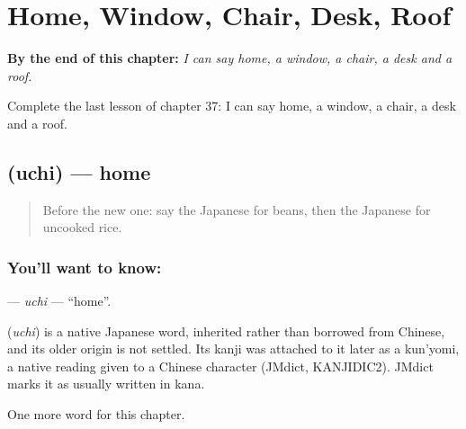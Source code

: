 
\chapter{Home, Window, Chair, Desk, Roof}
\label{ch:ja-home-window-chair-desk-roof}

\begin{chapteropening}
\textbf{By the end of this chapter:} \emph{I can say home, a window, a chair, a desk and a roof.}

Complete the last lesson of chapter 37: I can say home, a window, a chair, a desk and a roof.
\end{chapteropening}

\section[\texorpdfstring{\ja{うち} (uchi)}{うち (uchi)}]{ (uchi) — home}

\label{lesson:JA-C37-uchi}



\begin{quote}
Before the new one: say the Japanese for beans, then the Japanese for uncooked rice.
\end{quote}

\subsection*{You'll want to know: }
\textbf{} — \emph{uchi} — \textquotedblleft{}home\textquotedblright{}.

\begin{cousinweb}
\textbf{} (\emph{uchi}) is a native Japanese word, inherited rather than borrowed from Chinese, and its older origin is not settled. Its kanji was attached to it later as a kun'yomi, a native reading given to a Chinese character (JMdict, KANJIDIC2). JMdict marks it as usually written in kana.
\end{cousinweb}

\begin{grammarlens}[title={What you've built}]
One more word for this chapter.
\end{grammarlens}

